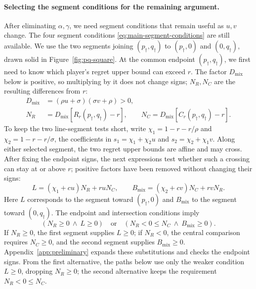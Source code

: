 \documentclass[11pt]{article}
\theoremstyle{remark}
\theoremstyle{plain}
\begin{document}
\paragraph{Selecting the segment conditions for the remaining argument.}
After eliminating $\alpha,\gamma$, we need segment conditions that
remain useful as $u,v$ change. The four segment conditions
\eqref{eq:main-segment-conditions} are still available. We use the
two segments joining $(p_\dagger,q_\dagger)$ to
$(p_\dagger,0)$ and $(0,q_\dagger)$, drawn solid in
Figure~\ref{fig:pq-square}.
At the common endpoint $(p_\dagger,q_\dagger)$, we first need to
know which player's regret upper bound can exceed $r$. The factor
$D_{\mathrm{mix}}$ below is positive, so multiplying by it does not
change signs; $N_R,N_C$ are the resulting differences from $r$:
\begin{equation}
 \begin{aligned}
 D_{\mathrm{mix}}&=(\rho u+\sigma)(\sigma v+\rho)>0,\\
 N_R&=D_{\mathrm{mix}}[R_r(p_\dagger,q_\dagger)-r],\qquad
 N_C=D_{\mathrm{mix}}[C_r(p_\dagger,q_\dagger)-r].
 \end{aligned}
 \label{eq:main-mixing-numerators}
\end{equation}
To keep the two line-segment tests short, write
$\chi_1=1-r-r/\rho$ and $\chi_2=1-r-r/\sigma$, the coefficients
in $s_1=\chi_1+\chi_2u$ and $s_2=\chi_2+\chi_1v$.
Along either selected segment, the two regret upper bounds are
affine and may cross. After fixing the endpoint signs, the next
expressions test whether such a crossing can stay at or above $r$;
positive factors have been removed without changing their signs:
\begin{equation}
 L=(\chi_1+cu)N_R+ruN_C,\qquad
 B_{\mathrm{mix}}=(\chi_2+cv)N_C+rvN_R.
 \label{eq:main-mixing-determinants}
\end{equation}
Here $L$ corresponds to the segment toward $(p_\dagger,0)$ and
$B_{\mathrm{mix}}$ to the segment toward $(0,q_\dagger)$.
The endpoint and intersection conditions imply
\begin{equation}
 (N_R\ge0\ \land\ L\ge0)
 \quad\text{or}\quad
 (N_R<0\le N_C\ \land\ B_{\mathrm{mix}}\ge0).
 \label{eq:main-mixing-branch-guards}
\end{equation}
If $N_R\ge0$, the first segment supplies $L\ge0$; if $N_R<0$,
the central comparison requires $N_C\ge0$, and the second segment
supplies $B_{\mathrm{mix}}\ge0$.
Appendix~\ref{app:preliminary} expands these substitutions and
checks the endpoint signs. From the first alternative, the paths
below use only the weaker condition $L\ge0$, dropping $N_R\ge0$;
the second alternative keeps the requirement $N_R<0\le N_C$.
\end{document}
